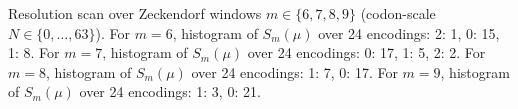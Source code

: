 Resolution scan over Zeckendorf windows $m\in\{6,7,8,9\}$ (codon-scale $N\in\{0,\dots,63\}$).
For $m=6$, histogram of $S_m(\mu)$ over 24 encodings: {2: 1, 0: 15, 1: 8}.
For $m=7$, histogram of $S_m(\mu)$ over 24 encodings: {0: 17, 1: 5, 2: 2}.
For $m=8$, histogram of $S_m(\mu)$ over 24 encodings: {1: 7, 0: 17}.
For $m=9$, histogram of $S_m(\mu)$ over 24 encodings: {1: 3, 0: 21}.
